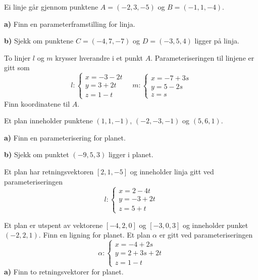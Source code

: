 %
%




\eqlen	
\opgt
\setcounter{section}{1}	
Ei linje går gjennom punktene $ A=(-2, 3, -5) $ og $ B=(-1, 1, -4) $.\os

\textbf{a)}	Finn en parameterframstilling for linja.\os

\textbf{b)} Sjekk om punktene $ C=(-4, 7, -7) $ og $ D=(-3, 5, 4) $ ligger på linja.

To linjer $ l $ og $ m $ krysser hverandre i et punkt $ A $. Parameteriseringen til linjene er gitt som
\[l: \left\lbrace{
	\begin{array}{l}
	x=-3-2t  \\
	y= 3+ 2t   \\
	z= 1-t 
	\end{array}
}\right. \quad 
m: \left\lbrace{
	\begin{array}{l}
	x=-7 +3s  \\
	y= 5- 2s   \\
	z= s 
	\end{array}
}\right. \]
Finn koordinatene til $ A $.

Et plan inneholder punktene $ (1, 1,-1) $, $ (-2, -3, -1) $ og $ (5, 6, 1) $. \os

\textbf{a)} Finn en parameterisering for planet.\os

\textbf{b)} Sjekk om punktet $ (-9, 5, 3) $ ligger i planet.


Et plan har retningsvektoren $ [2, 1, -5] $ og inneholder linja gitt ved parameteriseringen
\[ l: \left\lbrace{
	\begin{array}{l}
	x=2-4t  \\
	y= -3+ 2t   \\
	z= 5+t 
	\end{array}
}\right. \]


\nes
{}
Et plan er utspent av vektorene $ [-4, 2, 0] $ og $ [-3, 0, 3] $ og inneholder punket $ (-2, 2, 1) $. Finn en ligning for planet.
\newpage
{}
Et plan $ \alpha $ er gitt ved parameteriseringen
\[\alpha: \left\lbrace{
	\begin{array}{l}
	x=-4 + 2s  \\
	y= 2+ 3s + 2t   \\
	z= 1-t 
	\end{array}
}\right. \]
\textbf{a)} Finn to retningsvektorer for planet.\os


